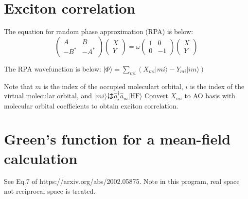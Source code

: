 \documentclass{article}
\begin{document}
\section{Exciton correlation}
The equation for random phase approximation (RPA) is below:
\begin{equation}
\begin{pmatrix}
A & B \\
-B^* & -A^*
\end{pmatrix}
\begin{pmatrix}
X \\
Y
\end{pmatrix}
= \omega
\begin{pmatrix}
1 & 0 \\
0 & -1
\end{pmatrix}
\begin{pmatrix}
X \\
Y
\end{pmatrix}
\end{equation}

The RPA wavefunction is below:
$|\Phi \rangle = \sum_{mi} (X_{mi}|mi\rangle - Y_{mi}|im\rangle)$

Note that $m$ is the index of the occupied moleculart orbital, $i$ is the index of the virtual molecular orbital,
and $|mi\rangle$は$\hat{a}^{\dagger}_{i}\hat{a}_{m}|\mathrm{HF}\rangle$
Convert $X_{mi}$ to AO basis with molecular orbital coefficients to obtain exciton correlation.

\section{Green's function for a mean-field calculation}
 See Eq.7 of https://arxiv.org/abs/2002.05875.
 Note in this program, real space not reciprocal space is treated.
\end{document}
